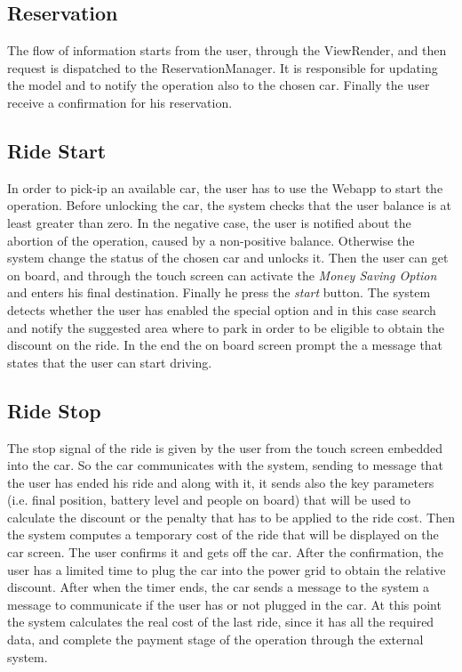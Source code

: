 \documentclass[11pt,a4paper]{report}
\begin{document}
\subsection{Reservation}
The flow of information starts from the user, through the ViewRender, and then request is dispatched to the ReservationManager. It is responsible for updating the model and to notify the operation also to the chosen car. Finally the user receive a confirmation for his reservation.
\subsection{Ride Start}
In order to pick-ip an available car, the user has to use the Webapp to start the operation. Before unlocking the car, the system checks that the user balance is at least greater than zero. In the negative case, the user is notified about the abortion of the operation, caused by a non-positive balance. Otherwise the system change the status of the chosen car and unlocks it. Then the user can get on board, and through the touch screen can activate the \textit{Money Saving Option} and enters his final destination. Finally he press the \textit{start} button. The system detects whether the user has enabled the special option and in this case search and notify the suggested area where to park in order to be eligible to obtain the discount on the ride.
In the end the on board screen prompt the a message that states that the user can start driving.
\subsection{Ride Stop}
The stop signal of the ride is given by the user from the touch screen embedded into the car. So the car communicates with the system, sending to message that the user has ended his ride and along with it, it sends also the key parameters (i.e. final position, battery level and people on board) that will be used to calculate the discount or the penalty that has to be applied to the ride cost. Then the system computes a temporary cost of the ride that will be displayed on the car screen. The user confirms it and gets off the car. After the confirmation, the user has a limited time to plug the car into the power grid to obtain the relative discount. After when the timer ends, the car sends a message to the system a message to communicate if the user has or not plugged in the car. At this point the system calculates the real cost of the last ride, since it has all the required data, and complete the payment stage of the operation through the external system.
\end{document}
